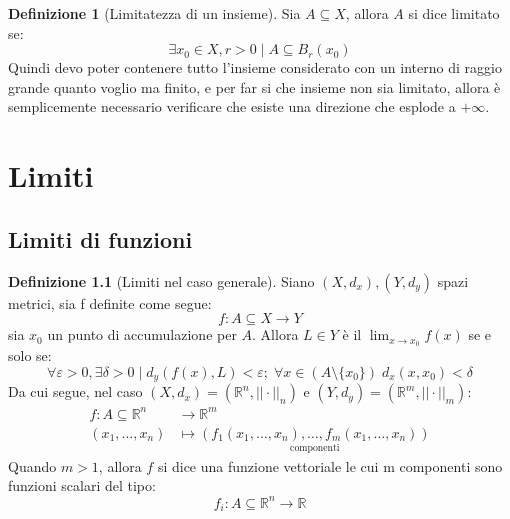 \documentclass[11pt, a4paper, openright]{book}
\theoremstyle{plain}
\theoremstyle{definition}
\newtheorem{definizione}[teorema]{Definizione}
\theoremstyle{remark}
\begin{document}
\begin{definizione}[Limitatezza di un insieme]
    Sia $A \subseteq X$, allora $A$ si dice limitato se:
    \begin{equation}
        \exists x_0 \in X, r > 0 \mid A \subseteq B_r(x_0)
    \end{equation}
    Quindi devo poter contenere tutto l'insieme considerato con un interno di raggio grande quanto voglio ma finito, e per far si che insieme non sia limitato, allora è semplicemente necessario verificare che esiste una direzione che esplode a $+\infty$.
\end{definizione}

\chapter{Limiti}
\section{Limiti di funzioni}
\begin{definizione}[Limiti nel caso generale]
    Siano $(X, d_x), (Y, d_y)$ spazi metrici, sia f definite come segue:
    \begin{equation}
        f: A \subseteq X \longrightarrow Y
    \end{equation}
    sia $x_0$ un punto di accumulazione per $A$.
    Allora $L \in Y$ è il $\lim_{x \to x_0} f(x)$ se e solo se:
    \begin{equation}
        \forall \varepsilon > 0, \exists \delta > 0 \mid d_y(f(x), L) < \varepsilon; \; \forall x \in (A \setminus \{x_0\}) \; d_x(x, x_0) < \delta
    \end{equation}
    Da cui segue, nel caso $(X, d_x) = (\mathbb{R}^n, ||\cdot||_n)$ e $(Y, d_y) = (\mathbb{R}^m, ||\cdot||_m)$:
    \begin{equation}
        \begin{aligned}
            f: A \subseteq \mathbb{R}^n &\longrightarrow \mathbb{R}^m \\
            (x_1, \dots, x_n) &\longmapsto \underset{\text{componenti}}{(f_1(x_1, \dots, x_n), \dots, f_m(x_1, \dots, x_n))}
        \end{aligned}
    \end{equation}
    Quando $m > 1$, allora $f$ si dice una funzione vettoriale le cui m componenti sono funzioni scalari del tipo:
    \begin{equation}
        f_i: A \subseteq \mathbb{R}^n \longrightarrow \mathbb{R}
    \end{equation}
\end{definizione}
\end{document}
